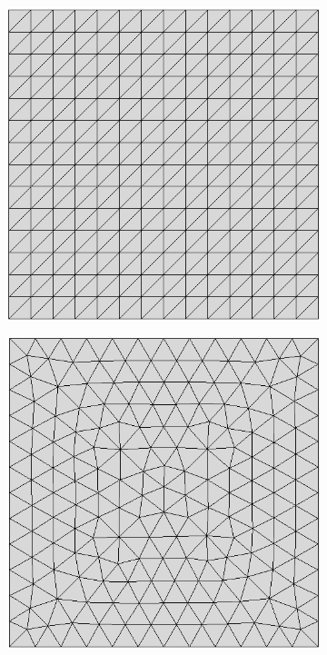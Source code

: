 %
\begin{figure}[b!]
\centering
  \begin{subfigure}[t]{0.25\textwidth}
    \centering
	\includegraphics[width=\textwidth]{Chapter2/Graphics/mesh_iso_homo_struct.png}
	\caption{}
    \label{fig:mesh_iso_homo_struct}
  \end{subfigure}
   \begin{subfigure}[t]{0.25\textwidth}
    \centering
	\includegraphics[width=\textwidth]{Chapter2/Graphics/mesh_iso_homo_unstruct.png}

\end{subfigure}
\end{figure}
